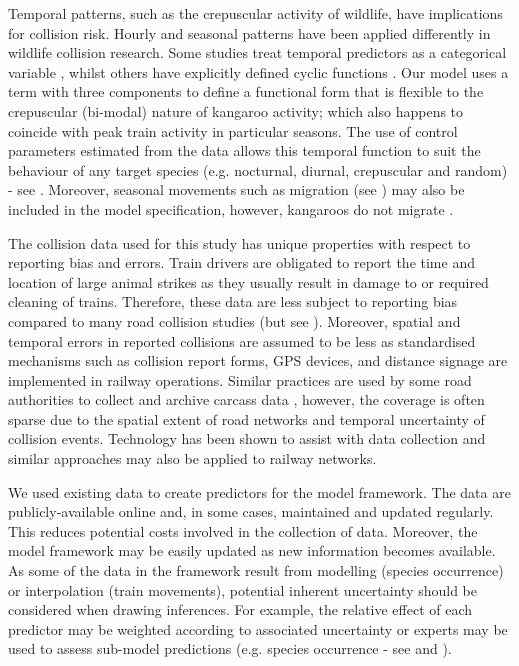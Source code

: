 Temporal patterns, such as the crepuscular activity of wildlife, have implications for collision risk. Hourly and seasonal patterns have been applied differently in wildlife collision research.  Some studies treat temporal predictors as a categorical variable \citep{duss06}, whilst others have explicitly defined cyclic functions \citep{thur15}.  Our model uses a term with three components to define a functional form that is flexible to the crepuscular (bi-modal) nature of kangaroo activity; which also happens to coincide with peak train activity in particular seasons. The use of control parameters estimated from the data allows this temporal function to suit the behaviour of any target species (e.g. nocturnal, diurnal, crepuscular and random) - see .  Moreover, seasonal movements such as migration (see \cite{neum12}) may also be included in the model specification, however, kangaroos do not migrate \citep{daws12}.

The collision data used for this study has unique properties with respect to reporting bias and errors.  Train drivers are obligated to report the time and location of large animal strikes as they usually result in damage to or required cleaning of trains.  Therefore, these data are less subject to reporting bias compared to many road collision studies (but see \cite{snow15}).  Moreover, spatial and temporal errors in reported collisions are assumed to be less as standardised mechanisms such as collision report forms, GPS devices, and distance signage are implemented in railway operations. Similar practices are used by some road authorities to collect and archive carcass data \citep{huij07a}, however, the coverage is often sparse due to the spatial extent of road networks and temporal uncertainty of collision events.  Technology has been shown to assist with data collection \citep{olso14,shil15b} and similar approaches may also be applied to railway networks.

We used existing data to create predictors for the model framework. The data are publicly-available online and, in some cases, maintained and updated regularly. This reduces potential costs involved in the collection of data. Moreover, the model framework may be easily updated as new information becomes available.  As some of the data in the framework result from modelling (species occurrence) or interpolation (train movements), potential inherent uncertainty should be considered when drawing inferences. For example, the relative effect of each predictor may be weighted according to associated uncertainty or experts may be used to assess sub-model predictions (e.g. species occurrence - see \cite{clev02} and \cite{wint05}).

